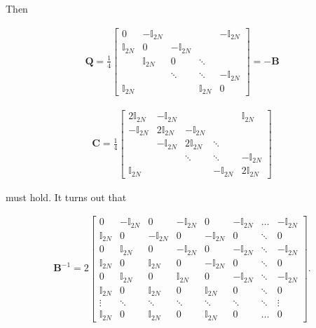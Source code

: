\documentclass{article}
\begin{document}
Then

\begin{align}
	\boldsymbol{Q}=\frac{1}{4} \begin{bmatrix}
		0& -\mathbb{I}_{2N} & & & -\mathbb{I}_{2N}\\
		\mathbb{I}_{2N}& 0 &-\mathbb{I}_{2N} & & \\
		 & \mathbb{I}_{2N} & 0 & \ddots & \\
		 &  & \ddots&\ddots & -\mathbb{I}_{2N}\\
		 \mathbb{I}_{2N}&  & & \mathbb{I}_{2N} & 0
	\end{bmatrix} = -\boldsymbol{B} 
\end{align}

\begin{align}
	\boldsymbol{C}=\frac{1}{4}
	\begin{bmatrix}
		2\mathbb{I}_{2N} & -\mathbb{I}_{2N} & & &\mathbb{I}_{2N}\\
		-\mathbb{I}_{2N} & 2\mathbb{I}_{2N}&-\mathbb{I}_{2N} \\
		 & -\mathbb{I}_{2N}&2\mathbb{I}_{2N}& \ddots &\\
		 & & \ddots & \ddots & -\mathbb{I}_{2N}\\
		 \mathbb{I}_{2N}&&&-\mathbb{I}_{2N}&2\mathbb{I}_{2N}
	\end{bmatrix}
\end{align}

 must hold. It turns out that

\begin{align}
	\boldsymbol{B}^{-1}= 2
	\begin{bmatrix}
		0				&-\mathbb{I}_{2N}	&0&-\mathbb{I}_{2N} & 0 &-\mathbb{I}_{2N} & \dots & -\mathbb{I}_{2N}\\
		\mathbb{I}_{2N} & 0 			 	& -\mathbb{I}_{2N} & 0 & -\mathbb{I}_{2N} & 0 &  \ddots & 0\\
		0 				& \mathbb{I}_{2N}	& 0 & -\mathbb{I}_{2N} & 0 & -\mathbb{I}_{2N} & \ddots & -\mathbb{I}_{2N}\\
		\mathbb{I}_{2N} & 0					 & \mathbb{I}_{2N} & 0 & -\mathbb{I}_{2N} & 0 &  \ddots & 0\\
		0				&\mathbb{I}_{2N}	&0&\mathbb{I}_{2N} & 0 &-\mathbb{I}_{2N} & \ddots & -\mathbb{I}_{2N}\\
		\mathbb{I}_{2N} & 0 				& \mathbb{I}_{2N} & 0 & \mathbb{I}_{2N} & 0 &  \ddots & 0\\
		\vdots 			& \ddots			 & \ddots & \ddots & \ddots & \ddots & \ddots & \vdots \\
		\mathbb{I}_{2N} & 0 				& \mathbb{I}_{2N} & 0 & \mathbb{I}_{2N} & 0 &\dots & 0 
	\end{bmatrix}.
\end{align}
\end{document}
